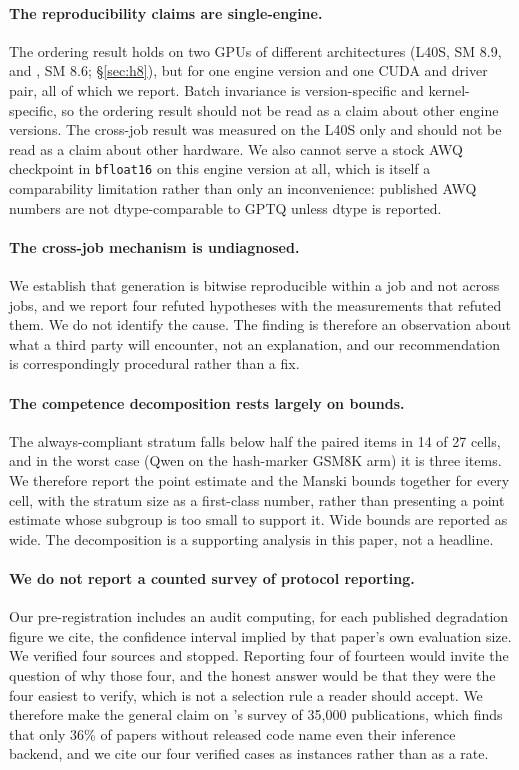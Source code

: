 \documentclass[conference]{IEEEtran}
\begin{document}
\paragraph{The reproducibility claims are single-engine.}
The ordering result holds on two GPUs of different architectures (L40S, SM 8.9, and
\hEightSpotGPU, SM 8.6; \S\ref{sec:h8}), but for one engine version and one CUDA and
driver pair, all of which we report. Batch invariance is version-specific and
kernel-specific, so the ordering result should not be read as a claim about other engine
versions. The cross-job result was measured on the L40S only and should not be read as a
claim about other hardware. We also cannot
serve a stock AWQ checkpoint in \texttt{bfloat16} on this engine version at all,
which is itself a comparability limitation rather than only an inconvenience:
published AWQ numbers are not dtype-comparable to GPTQ unless dtype is reported.

\paragraph{The cross-job mechanism is undiagnosed.}
We establish that generation is bitwise reproducible within a job and not across
jobs, and we report four refuted hypotheses with the measurements that refuted
them. We do not identify the cause. The finding is therefore an observation about
what a third party will encounter, not an explanation, and our recommendation is
correspondingly procedural rather than a fix.

\paragraph{The competence decomposition rests largely on bounds.}
The always-compliant stratum falls below half the paired items in 14 of 27 cells,
and in the worst case (Qwen on the hash-marker GSM8K arm) it is three items. We
therefore report the point estimate and the Manski bounds together for every cell,
with the stratum size as a first-class number, rather than presenting a point
estimate whose subgroup is too small to support it. Wide bounds are reported as
wide. The decomposition is a supporting analysis in this paper, not a headline.

\paragraph{We do not report a counted survey of protocol reporting.}
Our pre-registration includes an audit computing, for each published degradation
figure we cite, the confidence interval implied by that paper's own evaluation
size. We verified four sources and stopped. Reporting four of fourteen would
invite the question of why those four, and the honest answer would be that they
were the four easiest to verify, which is not a selection rule a reader should
accept. We therefore make the general claim on \citet{pape2026silent}'s survey of
35{,}000 publications, which finds that only 36\% of papers without released code
name even their inference backend, and we cite our four verified cases as
instances rather than as a rate.
\end{document}
